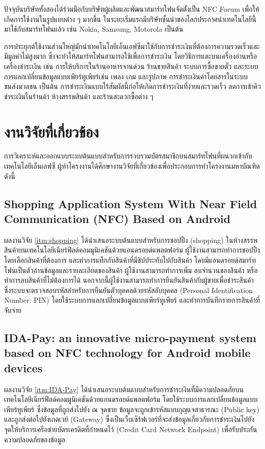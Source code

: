 \documentclass[a4paper]{article}
\begin{document}
ปัจจุบันบริษัททั้งสองได้ร่วมมือกับบริษัทผู้ผลิตและพัฒนาสมาร์ทโฟนจัดตั้งเป็น NFC Forum เพื่อให้เกิดการใช้งานในรูปแบบต่าง ๆ มากขึ้น ในระยะเริ่มแรกมีบริษัทชั้นนำของโลกประกาศนำเทคโนโลยีนี้มาใช้กับสมาร์ทโฟนแล้ว เช่น Nokia, Samsung, Motorola เป็นต้น

การประยุกต์ใช้งานส่วนใหญ่มักนำเทคโนโลยีเอ็นเอฟซีมาใช้กับการชำระเงินที่ต้องการความรวดเร็วและมีมูลค่าไม่สูงมาก ซึ่งจะทำให้สมาร์ทโฟนสามารถใช้เพื่อการชำระเงิน โดยวิธีการแตะบนเครื่องอ่านหรือเครื่องชำระเงิน เช่น การให้บริการในร้านอาหารจานด่วน ร้านขายสินค้า ระบบการซื้อขายตั๋ว และระบบการแลกเปลี่ยนข้อมูลแบบเพียร์ทูเพียร์เช่น เพลง เกม และรูปภาพ การชำระเงินค่าโดยสารในระบบขนส่งมวลชน เป็นต้น การชำระเงินแบบไร้สัมผัสนี้ก่อให้เกิดการชำระเงินที่ง่ายและรวดเร็ว ลดการเข้าคิวชำระเงินในร้านค้า ห้างสรรพสินค้า และร้านสะดวกซื้อต่าง ๆ


\section{งานวิจัยที่เกี่ยวข้อง}
การวิเคราะห์และออกแบบระบบต้นแบบสำหรับการรวบรวมบัตรสมาชิกบนสมาร์ทโฟนที่ผนวกเข้ากับเทคโนโลยีเอ็นเอฟซี ผู้ทำโครงงานได้ศึกษางานวิจัยที่เกี่ยวข้องเพื่อประกอบการทําโครงงานมหาบัณฑิต ดังนี้

\subsection{Shopping Application System With Near Field Communication (NFC) Based on Android}
ผลงานวิจัย \ref{itm:shopping}  ได้นำเสนอระบบต้นแบบสำหรับการชอปปิ้ง (shopping) ในห้างสรรพสินค้าบนเทคโนโลยีเนียร์ฟิลด์คอมมูนิเคชันด้วยแอนดรอยด์แพลตฟอร์ม ผู้ใช้งานสามารถทำการชอปปิ้งโดยเลือกสินค้าที่ต้องการ และทำการแท็กกับสินค้าที่มีชิปประทับไปกับสินค้า โดยมีแอนดรอยด์สมาร์ทโฟนเป็นตัวอ่านข้อมูลและรายละเอียดของสินค้า ผู้ใช้งานสามารถทำการเพิ่ม ลบจำนวนของสินค้า หรือทำการลบสินค้าที่ไม่ต้องการได้ นอกจากนี้ผู้ใช้งานสามารถทำการยืนยันสินค้ากับผู้ขายเพื่อชำระสินค้า ซึ่งระบบจะตรวจสอบรหัสสำหรับการยืนยันตัวบุคคลด้วยรหัสลับบุคคล (Personal Identification Number: PIN) โดยใช้ระบบการแลกเปลี่ยนข้อมูลแบบเพียร์ทูเพียร์ และทำการบันทึกรายการสินค้าที่จับจ่าย

\subsection{IDA-Pay: an innovative micro-payment system based on NFC technology for Android mobile devices}
ผลงานวิจัย \ref{itm:IDA-Pay} ได้นำเสนอระบบต้นแบบสำหรับการชำระเงินที่มีความปลอดภัยบนเทคโนโลยีเนียร์ฟิลด์คอมมูนิเคชันด้วยแอนดรอยด์แพลตฟอร์ม โดยใช้ระบบการแลกเปลี่ยนข้อมูลแบบเพียร์ทูเพียร์ ซึ่งข้อมูลที่ถูกส่งไปยัง ณ จุดขาย ข้อมูลจะถูกเข้ารหัสแบบกุญแจสาธารณะ (Public key) และถูกส่งต่อไปยังเกตเวย์ (Gateway) ซึ่งเป็นเว็บเซิร์ฟเวอร์ที่จะส่งข้อมูลเกี่ยวกับการชำระเงินไปยังจุดให้บริการเครือข่ายบัตรเครดิตที่กำหนดไว้ (Credit Card Network Endpoint) เพื่อรับประกันความปลอดภัยของข้อมูล
\end{document}
